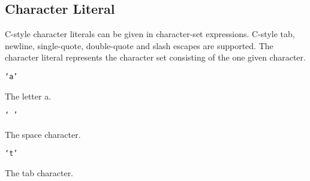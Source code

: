 
\subsection{Character Literal}
{
	C-style character literals can be given in character-set expressions.
	C-style tab, newline, single-quote, double-quote and slash escapes are
	supported.
	The character literal represents the character set consisting of
	the one given character.
	
	\begin{itemize}
	{
		\item[] \texttt{`a'}
		
			The letter a.
		
		\item[] \texttt{` '}
		
			The space character.
		
		\item[] \texttt{`t'}
		
			The tab character.
	}
	\end{itemize}
}
